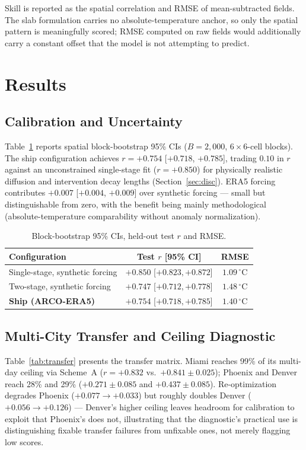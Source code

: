 \documentclass[conference]{IEEEtran}
\begin{document}
Skill is reported as the spatial correlation and RMSE of mean-subtracted
fields. The slab formulation carries no absolute-temperature anchor, so
only the spatial pattern is meaningfully scored; RMSE computed on raw
fields would additionally carry a constant offset that the model is not
attempting to predict.

\section{Results}
\label{sec:results}

\subsection{Calibration and Uncertainty}
Table~\ref{tab:bootstrap_ci} reports spatial block-bootstrap 95\% CIs
($B{=}2{,}000$, $6{\times}6$-cell blocks). The ship configuration achieves
$r{=}{+}0.754$ [$+0.718$, $+0.785$], trading $0.10$ in $r$ against an
unconstrained single-stage fit ($r{=}{+}0.850$) for physically realistic
diffusion and intervention decay lengths (Section~\ref{sec:disc}). ERA5
forcing contributes $+0.007$ [$+0.004$, $+0.009$] over synthetic forcing ---
small but distinguishable from zero, with the benefit being mainly
methodological (absolute-temperature comparability without anomaly
normalization).

\begin{table}[ht]
  \centering
  \caption{Block-bootstrap 95\% CIs, held-out test $r$ and RMSE.}
  \label{tab:bootstrap_ci}
  \scriptsize
  \begin{tabular}{lcc}
    \toprule
    Configuration & Test $r$ [95\% CI] & RMSE \\
    \midrule
    Single-stage, synthetic forcing & $+0.850$ [$+0.823,+0.872$] & $1.09$\,$^{\circ}$C \\
    Two-stage, synthetic forcing & $+0.747$ [$+0.712,+0.778$] & $1.48$\,$^{\circ}$C \\
    \textbf{Ship (ARCO-ERA5)} & $\mathbf{+0.754}$ [$+0.718,+0.785$] & $\mathbf{1.40}$\,$^{\circ}$C \\
    \bottomrule
  \end{tabular}
\end{table}

\subsection{Multi-City Transfer and Ceiling Diagnostic}
Table~\ref{tab:transfer} presents the transfer matrix. Miami reaches 99\%
of its multi-day ceiling via Scheme~A ($r{=}{+}0.832$ vs.\
$+0.841\pm0.025$); Phoenix and Denver reach 28\% and 29\%
($+0.271\pm0.085$ and $+0.437\pm0.085$). Re-optimization degrades Phoenix
($+0.077\to+0.033$) but roughly doubles Denver ($+0.056\to+0.126$) ---
Denver's higher ceiling leaves headroom for calibration to exploit that
Phoenix's does not, illustrating that the diagnostic's practical use is
distinguishing fixable transfer failures from unfixable ones, not merely
flagging low scores.
\end{document}
